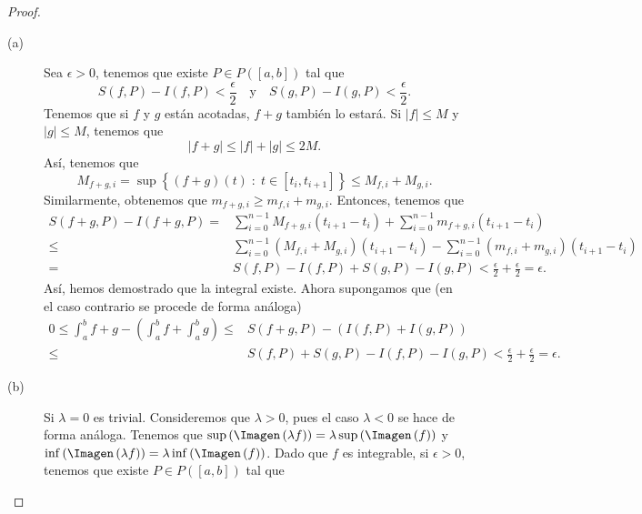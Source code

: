 \begin{proof}
\begin{description}
\item[(a)] Sea $\displaystyle \epsilon > 0 $, tenemos que existe $\displaystyle P \in P\left([a,b]\right) $ tal que 
	\[ S\left(f,P\right)-I\left(f,P\right) < \frac{\epsilon }{2} \quad \text{y} \quad S\left(g,P\right)-I\left(g,P\right) < \frac{\epsilon }{2} .\]
	Tenemos que si $\displaystyle f $ y $\displaystyle g $ están acotadas, $\displaystyle f+g $ también lo estará. Si $\displaystyle \left|f\right| \leq M $ y $\displaystyle \left|g\right|\leq M $, tenemos que 
	\[ \left|f+g\right| \leq \left|f\right| + \left|g\right| \leq 2M .\]
Así, tenemos que 
\[ M_{f+g,i} = \sup \left\{ \left(f+g\right)\left(t\right) \; : \; t \in \left[t_{i}, t_{i+1}\right] \right\} \leq M_{f,i} + M_{g,i}.\]
Similarmente, obtenemos que $\displaystyle m_{f+g,i} \geq m_{f,i} + m_{g,i} $. Entonces, tenemos que 
\[
\begin{split}
	S\left(f+g,P\right)-I\left(f+g,P\right) = & \sum^{n-1}_{i=0}M_{f+g,i}\left(t_{i+1}-t_{i}\right) + \sum^{n-1}_{i =0}m_{f+g,i}\left(t_{i+1}-t_{i}\right) \\
	\leq & \sum^{n-1}_{i = 0}\left(M_{f,i}+M_{g,i}\right)\left(t_{i+1}-t_{i}\right) - \sum^{n-1}_{i = 0}\left(m_{f,i}+m_{g,i}\right)\left(t_{i+1}-t_{i}\right)\\
	= & S\left(f,P\right)-I\left(f,P\right)+S\left(g,P\right)-I\left(g,P\right) < \frac{\epsilon }{2} + \frac{\epsilon }{2} = \epsilon  .
\end{split}
\]
Así, hemos demostrado que la integral existe. Ahora supongamos que (en el caso contrario se procede de forma análoga)
\[
\begin{split}
	0 \leq \int^{b}_{a} f +g - \left(\int^{b}_{a} f +\int^{b}_{a} g \right) \leq & S\left(f+g,P\right)-\left(I\left(f,P\right)+I\left(g,P\right)\right) \\ \leq & S\left(f,P\right)+S\left(g,P\right)-I\left(f,P\right)-I\left(g,P\right) < \frac{\epsilon }{2} + \frac{\epsilon }{2} = \epsilon .
\end{split}
\]
\item[(b)] Si $\displaystyle \lambda = 0 $ es trivial. Consideremos que $\displaystyle \lambda > 0 $, pues el caso $\displaystyle \lambda < 0 $ se hace de forma análoga. Tenemos que $\displaystyle \sup\left(\Imagen\left(\lambda f\right)\right) = \lambda \sup \left(\Imagen\left(f\right)\right) $ y $\displaystyle \inf\left(\Imagen\left(\lambda f\right)\right) = \lambda \inf\left(\Imagen\left(f\right)\right) $. Dado que $\displaystyle f $ es integrable, si $\displaystyle \epsilon > 0 $, tenemos que existe $\displaystyle P \in P\left(\left[a,b\right] \right) $ tal que 

\end{description}
\end{proof}
